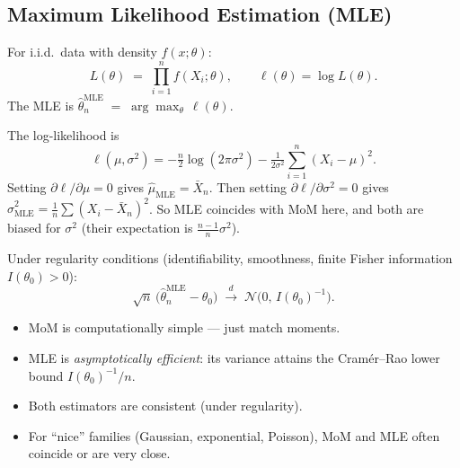 \subsection{Maximum Likelihood Estimation (MLE)}

\begin{defbox}
For i.i.d.\ data with density $f(x; \theta)$:
\[
  L(\theta) \;=\; \prod_{i=1}^{n} f(X_i; \theta),
  \qquad
  \ell(\theta) = \log L(\theta).
\]
The MLE is $\widehat{\theta}_n^{\text{MLE}}
\;=\; \arg\max_\theta\, \ell(\theta)$.
\end{defbox}

\begin{exbox}
\label{ex:mle-gaussian}
The log-likelihood is
\[
  \ell(\mu, \sigma^2)
  = -\tfrac{n}{2}\log(2\pi\sigma^2)
    - \tfrac{1}{2\sigma^2}\sum_{i=1}^{n}(X_i - \mu)^2.
\]
Setting $\partial \ell / \partial \mu = 0$ gives
$\widehat{\mu}_{\text{MLE}} = \bar{X}_n$. Then setting
$\partial \ell / \partial \sigma^2 = 0$ gives
$\widehat{\sigma}^2_{\text{MLE}}
= \tfrac{1}{n}\sum(X_i - \bar{X}_n)^2$. So MLE coincides with MoM here,
and both are biased for $\sigma^2$ (their expectation is
$\tfrac{n-1}{n}\sigma^2$).
\end{exbox}

\begin{thbox}
\label{th:mle-asymp}
Under regularity conditions (identifiability, smoothness, finite Fisher
information $I(\theta_0) > 0$):
\[
  \sqrt{n}\,\bigl(\widehat{\theta}_n^{\text{MLE}} - \theta_0\bigr)
  \;\xrightarrow{d}\;
  \mathcal{N}\!\bigl(0,\, I(\theta_0)^{-1}\bigr).
\]
\end{thbox}

\begin{rembox}
\begin{itemize}
  \item MoM is computationally simple — just match moments.
  \item MLE is \emph{asymptotically efficient}: its variance attains
        the Cramér--Rao lower bound $I(\theta_0)^{-1}/n$.
  \item Both estimators are consistent (under regularity).
  \item For ``nice'' families (Gaussian, exponential, Poisson), MoM
        and MLE often coincide or are very close.
\end{itemize}
\end{rembox}

